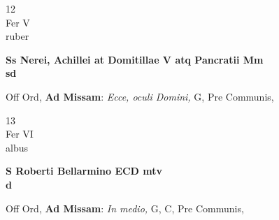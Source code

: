 \documentclass[10pt, openany]{book}
\begin{document}
        \begin{center}
            \begin{minipage}{3.5in}
                \vspace{2em}
                \begin{minipage}{0.5in}
                    {\Huge 12} \\
                    {\normalsize Fer V} \\
                    {\normalsize ruber}
                \end{minipage}
                \begin{minipage}{3.0in}
                    \textbf{ \large Ss Nerei, Achillei at Domitillae V atq Pancratii Mm \\
                    \textnormal{\normalsize sd}} \\ 
                \end{minipage}
                \begin{justify}Off Ord, \textbf{Ad Missam}: \textit{Ecce, oculi Domini,} G, Pre Communis,  
                \end{justify}
            \end{minipage}
        \end{center}
    
        \begin{center}
            \begin{minipage}{3.5in}
                \vspace{2em}
                \begin{minipage}{0.5in}
                    {\Huge 13} \\
                    {\normalsize Fer VI} \\
                    {\normalsize albus}
                \end{minipage}
                \begin{minipage}{3.0in}
                    \textbf{ \large S Roberti Bellarmino ECD mtv \\
                    \textnormal{\normalsize d}} \\ 
                \end{minipage}
                \begin{justify}Off Ord, \textbf{Ad Missam}: \textit{In medio,} G, C, Pre Communis,  
                \end{justify}
            \end{minipage}
        \end{center}
    
\end{document}

